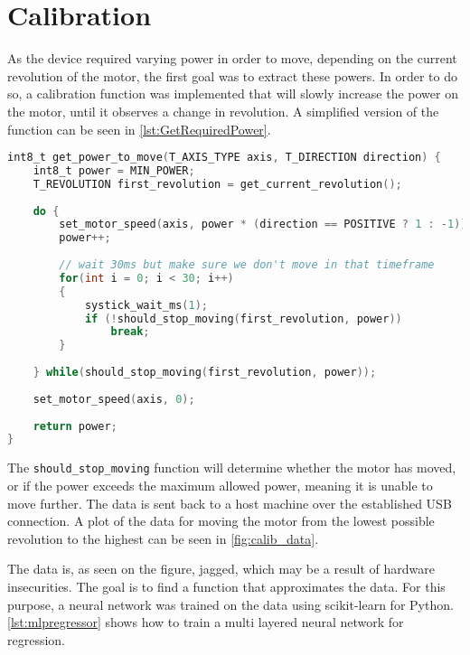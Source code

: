 \section{Calibration}\label{sec:calibration}

As the device required varying power in order to move, depending on the current revolution of the motor, the first goal was to extract these powers.
In order to do so, a calibration function was implemented that will slowly increase the power on the motor, until it observes a change in revolution.
A simplified version of the function can be seen in \autoref{lst:GetRequiredPower}.


\begin{lstlisting}[language=C,label={lst:GetRequiredPower},caption={Getting required power to move }]
int8_t get_power_to_move(T_AXIS_TYPE axis, T_DIRECTION direction) {
	int8_t power = MIN_POWER;
	T_REVOLUTION first_revolution = get_current_revolution();
	
	do {
		set_motor_speed(axis, power * (direction == POSITIVE ? 1 : -1));
		power++;
		
		// wait 30ms but make sure we don't move in that timeframe
		for(int i = 0; i < 30; i++)
		{
			systick_wait_ms(1);
			if (!should_stop_moving(first_revolution, power))
				break;
		}
	
	} while(should_stop_moving(first_revolution, power));
	
	set_motor_speed(axis, 0);
	
	return power;
}

\end{lstlisting}

The \texttt{should\_stop\_moving} function will determine whether the motor has moved, or if the power exceeds the maximum allowed power, meaning it is unable to move further.
The data is sent back to a host machine over the established USB connection.
A plot of the data for moving the motor from the lowest possible revolution to the highest can be seen in \autoref{fig:calib_data}.


The data is, as seen on the figure, jagged, which may be a result of hardware insecurities.
The goal is to find a function that approximates the data.
For this purpose, a neural network was trained on the data using scikit-learn for Python.
\autoref{lst:mlpregressor} shows how to train a multi layered neural network for regression.

